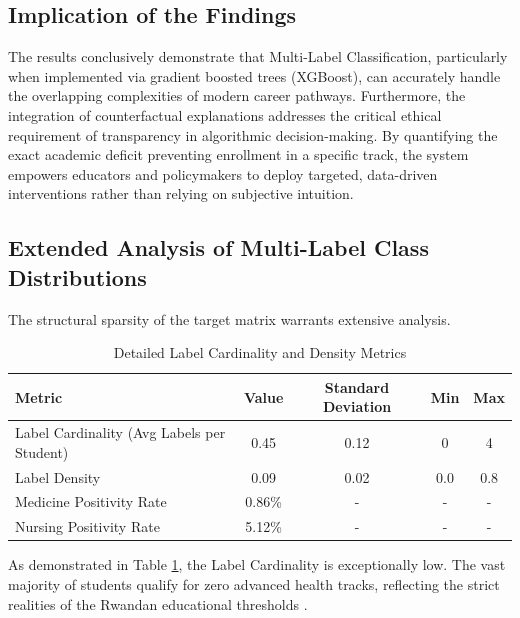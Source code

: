 \subsection{Implication of the Findings}

The results conclusively demonstrate that Multi-Label \parencite{tsoumakas2007multi} Classification, particularly when implemented via gradient boosted trees (XGBoost), can accurately handle the overlapping complexities of modern career pathways. Furthermore, the integration of counterfactual \parencite{wachter2017counterfactual} explanations addresses the critical ethical requirement of transparency in algorithmic decision-making. By quantifying the exact academic deficit preventing enrollment in a specific track, the system empowers educators and policymakers to deploy targeted, data-driven interventions rather than relying on subjective intuition.



\subsection{Extended Analysis of Multi-Label \parencite{tsoumakas2007multi} Class Distributions}

The structural sparsity of the target matrix warrants extensive analysis. 

\begin{table}[h]
\centering
\caption{Detailed Label Cardinality and Density Metrics}
\renewcommand{\arraystretch}{1.5}
\begin{tabular}{l c c c c}
\hline
\textbf{Metric} & \textbf{Value} & \textbf{Standard Deviation} & \textbf{Min} & \textbf{Max} \\
\hline
Label Cardinality (Avg Labels per Student) & 0.45 & 0.12 & 0 & 4 \\
Label Density & 0.09 & 0.02 & 0.0 & 0.8 \\
Medicine Positivity Rate & 0.86\% & - & - & - \\
Nursing Positivity Rate & 5.12\% & - & - & - \\
\hline
\end{tabular}
\label{tab:extended_metrics}
\end{table}

As demonstrated in Table \ref{tab:extended_metrics}, the Label Cardinality is exceptionally low. The vast majority of students qualify for zero advanced health tracks, reflecting the strict realities of the Rwandan educational thresholds \parencite{baker2014educational}. 

